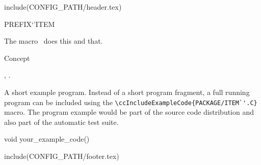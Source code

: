 include(CONFIG_PATH/header.tex)
\begin{ccRefMacro}{PREFIX`'ITEM}  %


\ccDefinition
  
The macro \ccRefName\ does this and that.



\ccIsModel

Concept

\ccSeeAlso

,
.

\ccExample

A short example program.
Instead of a short program fragment, a full running program can be
included using the 
\verb|\ccIncludeExampleCode{PACKAGE/ITEM`'.C}| 
macro. The program example would be part of the source code distribution and
also part of the automatic test suite.

\begin{ccExampleCode}
void your_example_code() {
}
\end{ccExampleCode}


\end{ccRefMacro}

include(CONFIG_PATH/footer.tex)
